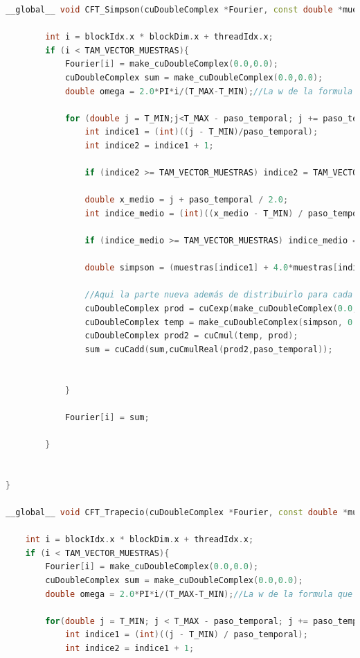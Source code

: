\documentclass[12pt]{article}
\begin{document}
\begin{lstlisting}[language=C++, basicstyle=\ttfamily\small, frame=single]
__global__ void CFT_Simpson(cuDoubleComplex *Fourier, const double *muestras, const int TAM_VECTOR_MUESTRAS, const double paso_temporal){

        int i = blockIdx.x * blockDim.x + threadIdx.x;
        if (i < TAM_VECTOR_MUESTRAS){
            Fourier[i] = make_cuDoubleComplex(0.0,0.0);
            cuDoubleComplex sum = make_cuDoubleComplex(0.0,0.0);
            double omega = 2.0*PI*i/(T_MAX-T_MIN);//La w de la formula que es el omega

            for (double j = T_MIN;j<T_MAX - paso_temporal; j += paso_temporal){
                int indice1 = (int)((j - T_MIN)/paso_temporal);
                int indice2 = indice1 + 1;

                if (indice2 >= TAM_VECTOR_MUESTRAS) indice2 = TAM_VECTOR_MUESTRAS - 1;
                
                double x_medio = j + paso_temporal / 2.0;
                int indice_medio = (int)((x_medio - T_MIN) / paso_temporal);

                if (indice_medio >= TAM_VECTOR_MUESTRAS) indice_medio = TAM_VECTOR_MUESTRAS - 1;

                double simpson = (muestras[indice1] + 4.0*muestras[indice_medio] + muestras[indice2])/6.0;

                //Aqui la parte nueva además de distribuirlo para cada 
                cuDoubleComplex prod = cuCexp(make_cuDoubleComplex(0.0, -omega * j));
                cuDoubleComplex temp = make_cuDoubleComplex(simpson, 0.0);
                cuDoubleComplex prod2 = cuCmul(temp, prod);
                sum = cuCadd(sum,cuCmulReal(prod2,paso_temporal));


            }

            Fourier[i] = sum;

        }


}

__global__ void CFT_Trapecio(cuDoubleComplex *Fourier, const double *muestras, const int TAM_VECTOR_MUESTRAS, const double paso_temporal){

    int i = blockIdx.x * blockDim.x + threadIdx.x;
    if (i < TAM_VECTOR_MUESTRAS){
        Fourier[i] = make_cuDoubleComplex(0.0,0.0);
        cuDoubleComplex sum = make_cuDoubleComplex(0.0,0.0);
        double omega = 2.0*PI*i/(T_MAX-T_MIN);//La w de la formula que es el omega

        for(double j = T_MIN; j < T_MAX - paso_temporal; j += paso_temporal){
            int indice1 = (int)((j - T_MIN) / paso_temporal);
            int indice2 = indice1 + 1;


\end{lstlisting}
\end{document}
